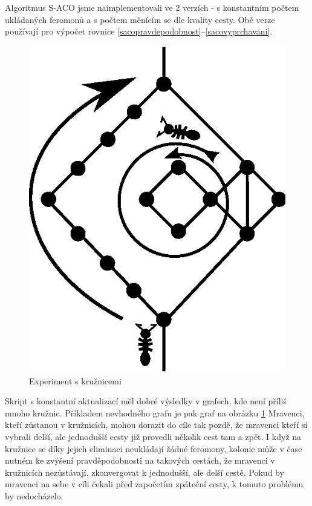 \documentclass[12pt]{article}
\begin{document}
Algoritmus S-ACO jsme naimplementovali ve 2 verzích - s konstantním počtem ukládaných feromonů a s počtem měnícím se dle kvality cesty.
Obě verze používají pro výpočet rovnice \eqref{sacopravdepodobnost}--\eqref{sacovyprchavani}.
\begin{figure}[btp]\caption{Experiment s kružnicemi} \label{fig:extendeddoublebridge}
	\centering
	\includegraphics{extended_double_bridge}
\end{figure}
Skript s konstantní aktualizací měl dobré výsledky v grafech, kde není příliš mnoho kružnic. Příkladem nevhodného grafu je pak graf na obrázku \ref{fig:extendeddoublebridge}
Mravenci, kteří zůstanou v kružnicích, mohou dorazit do cíle tak pozdě, že mravenci kteří si vybrali delší, ale jednodušší cesty již provedli několik cest tam a zpět. I když na kružnice se díky jejich eliminaci neukládají žádné feromony, kolonie může v čase nutném ke zvýšení pravděpodobnosti na takových cestách, že mravenci v kružnicích nezůstávají, zkonvergovat k jednodušší, ale delší cestě.  Pokud by mravenci na sebe v cíli čekali před započetím zpáteční cesty, k tomuto problému by nedocházelo. 
\end{document}
